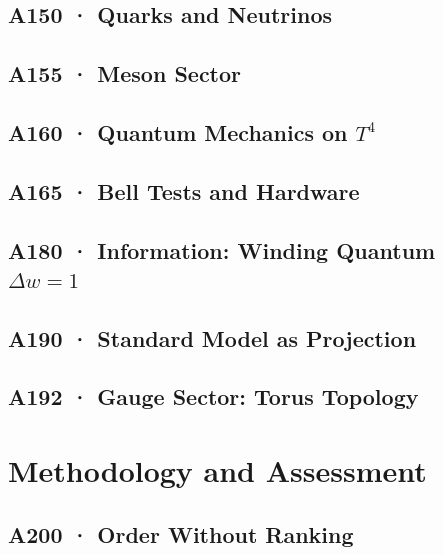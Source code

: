 \documentclass[11pt,twoside,openright]{book}
\begin{document}
\chapter[A150 · Quarks and Neutrinos]{A150 · Quarks and Neutrinos}


\chapter[A155 · Meson Sector]{A155 · Meson Sector}


\chapter[A160 · Quantum Mechanics on $T^4$]{A160 · Quantum Mechanics on $T^4$}


\chapter[A165 · Bell Tests and Hardware]{A165 · Bell Tests and Hardware}


\chapter[A180 · Information]{A180 · Information: Winding Quantum $\Delta w=1$}


\chapter[A190 · Standard Model as Projection]{A190 · Standard Model as Projection}


\chapter[A192 · Gauge Sector]{A192 · Gauge Sector: Torus Topology}


\part{Methodology and Assessment}

\chapter[A200 · Order Without Ranking]{A200 · Order Without Ranking}

\end{document}
